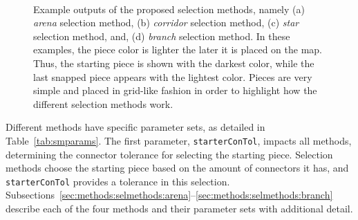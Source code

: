 \documentclass[journal]{IEEEtran}
\begin{document}
\begin{figure}[t!]
  \centering
  \mbox{}
  \\
  \mbox{}
  \caption{Example outputs of the proposed selection methods, namely
    (a) \emph{arena} selection method,
    (b) \emph{corridor} selection method,
    (c) \emph{star} selection method,
    and,
    (d) \emph{branch} selection method.
    In these examples, the piece color
    is lighter the later it is placed on the map. Thus, the starting piece is shown with the
    darkest color, while the last snapped piece appears with the lightest color. Pieces are
    very simple and placed in grid-like fashion in order to highlight how the different
    selection methods work.
    }
  \label{fig:genoutput}
\end{figure}

Different methods have specific parameter sets, as detailed in Table~\ref{tab:smparams}.
The first parameter, \texttt{starterConTol}, impacts all methods, determining the connector
tolerance for selecting the starting piece. Selection methods choose the starting piece
based on the amount of connectors it has, and \texttt{starterConTol} provides a tolerance
in this selection.
Subsections~\ref{sec:methods:selmethods:arena}--\ref{sec:methods:selmethods:branch}
describe each of the four methods and their parameter sets with additional detail.
\end{document}
